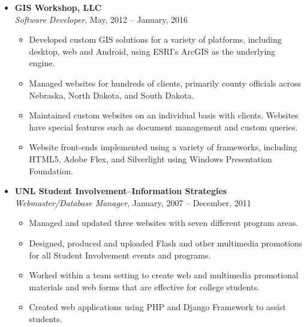 \documentclass[12pt]{report}
\begin{document}
\begin{center}
{{\begin{itemize}
\item\textbf{GIS Workshop, LLC}\\
\textit{Software Developer}, May, 2012 -- January, 2016
\begin{itemize}
\item Developed custom GIS solutions for a variety of platforms, including desktop, web and Android, using ESRI's ArcGIS as the underlying engine.
\item Managed websites for hundreds of clients, primarily county officials across Nebraska, North Dakota, and South Dakota.
\item Maintained custom websites on an individual basis with clients. Websites have special features such as document management and custom queries.
\item Website front-ends implemented using a variety of frameworks, including HTML5, Adobe Flex, and Silverlight using Windows Presentation Foundation.
\end{itemize}

\item\textbf{UNL Student Involvement--Information Strategies}\\
\textit{Webmaster/Database Manager}, January, 2007 -- December, 2011
\begin{itemize}
\item Managed and updated three websites with seven different program areas.
\item Designed, produced and uploaded Flash and other multimedia promotions for all Student Involvement events and programs.
\item Worked within a team setting to create web and multimedia promotional materials and web forms that are effective for college students.
\item Created web applications using PHP and Django Framework to assist students.
\end{itemize}



\end{itemize}}}
\end{center}
\end{document}
